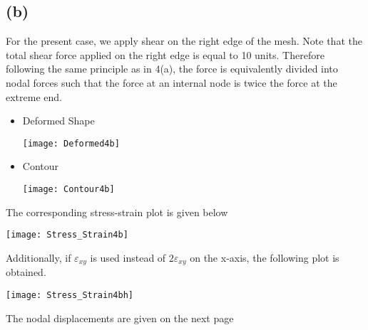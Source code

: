 \subsection*{(b)}
For the present case, we apply shear on the right edge of the mesh. Note that the total shear force applied on the right edge is equal to 10 units. Therefore following the same principle as in 4(a), the force is equivalently divided into nodal forces such that the force at an internal node is twice the force at the extreme end.
\begin{itemize}
\item Deformed Shape
\begin{center}
\texttt{[image: Deformed4b]}
\end{center}
\newpage \item Contour
\begin{center}
\texttt{[image: Contour4b]}
\end{center}
\end{itemize} 
The corresponding stress-strain plot is given below
\begin{center}
\texttt{[image: Stress\_Strain4b]}
\end{center}
\newpage Additionally, if $\varepsilon_{xy}$ is used instead of $2\varepsilon_{xy}$ on the x-axis, the following plot is obtained. 
\begin{center}
\texttt{[image: Stress\_Strain4bh]}
\end{center}
 The nodal displacements are given on the next page
